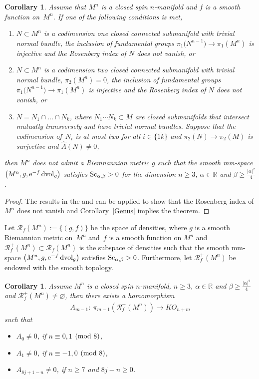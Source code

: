 \documentclass[10pt,a4paper]{amsart}
\newtheorem{Corollary}[Theorem]{Corollary}
\begin{document}
\begin{Corollary}Assume that $M^n$ is a closed spin $n$-manifold and $f$ is a smooth function on~$M^n$. If one of the following conditions is met,
\begin{enumerate}\itemsep=0pt
\item[$(1)$] $N \subset M^n$ is a codimension one closed connected submanifold with trivial normal bundle, the inclusion of fundamental groups $\pi_1\big(N^{n-1}\big)\rightarrow\pi_1(M^n)$ is injective and the Rosenberg index of $N$ does not vanish, or
\item[$(2)$] $N\subset M^n$ is a codimension two closed connected submanifold with trivial normal bundle, $\pi_2(M^n)=0$, the inclusion of fundamental groups $\pi_1\big(N^{n-1}\big)\rightarrow\pi_1(M^n)$ is injective and the Rosenberg index of $N$ does not vanish, or
\item[$(3)$] $N=N_1\cap \dots \cap N_k$, where $N_1 \cdots N_k\subset M$ are closed submanifolds that intersect mutually transversely and have trivial normal bundles. Suppose that the codimension of~$N_i$ is at most two for all $i\in \{1\dot k \}$ and $\pi_2(N) \rightarrow \pi_2(M)$ is surjective and $\hat{A}(N)\neq 0$,
\end{enumerate}
 then $M^n$ does not admit a Riemnannian metric $g$ such that the smooth mm-space $\big(M^n, g, \allowbreak {\rm e}^{-f}\,{\rm dvol}_g\big)$ satisfies ${\rm Sc}_{\alpha, \beta}> 0$ for the dimension $n\geq 3$, $\alpha \in \mathbb{R}$ and $\beta \geq \frac{|\alpha|^2}{4}$.
\end{Corollary}

\begin{proof}The results in the \cite[Theorem~1.1]{MR3449594} and \cite[Theorem~1.9]{MR3704253} can be applied to show that the Rosenberg index of $M^n$ does not vanish and Corollary~\ref{Genus} implies the theorem.
\end{proof}

Let $\mathcal{R}_f(M^n):=\{(g,f)\}$ be the space of densities, where $g$ is a smooth Riemannian metric on~$M^n$ and~$f$ is a smooth function on $M^n$ and $\mathcal{R}^+_f(M^n)\subset \mathcal{R}_f(M^n)$ is the subspace of densities such that the smooth mm-space $\big(M^n, g, {\rm e}^{-f}\,{\rm dvol}_g\big)$ satisfies ${\rm Sc}_{\alpha, \beta}> 0$. Furthermore, let $\mathcal{R}^+_f(M^n)$ be endowed with the smooth topology.

\begin{Corollary}Assume $M^n$ is a closed spin $n$-manifold, $n\geq 3$, $\alpha \in \mathbb{R}$ and $\beta \geq \frac{|\alpha|^2}{4}$ and $\mathcal{R}^+_f(M^n)\neq \varnothing$, then there exists a homomorphism
\begin{gather*}
A_{m-1}\colon \ \pi_{m-1}(\mathcal{R}^+_f(M^n))\to KO_{n+m}
\end{gather*}
such that
\begin{itemize}\itemsep=0pt
\item $A_0\neq 0$, if $n\equiv 0,1$ $({\rm mod}~8)$,
\item $A_1\neq 0$, if $n\equiv -1,0$ $({\rm mod}~8)$,
\item $A_{8j+1-n}\neq 0$, if $n\geq 7$ and $8j-n\geq 0$.
\end{itemize}
\end{Corollary}
\end{document}
